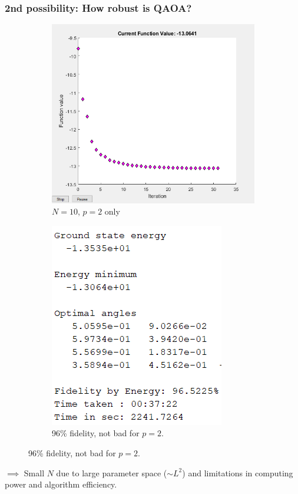 \documentclass{beamer}
\theoremstyle{definition}
\begin{document}


\begin{frame}
\frametitle{2nd possibility: How robust is QAOA?}





\begin{figure}[!htb]
	\centering
	\begin{subfigure}{0.5 \textwidth}
		\centering
		\includegraphics[scale=0.30]{N_10_p_2.PNG}
		\caption{$N=10$, $p=2$ only}
	\end{subfigure}%
	\begin{subfigure}{0.5 \textwidth}
		\centering
		\includegraphics[scale=0.47]{N_10_p_2_out}
		\caption{96\% fidelity, not bad for $p=2$.}
	\end{subfigure}
\end{figure}

\pause

$\implies$ Small $N$ due to large parameter space ($\sim L^2$) and limitations in computing power and algorithm efficiency.











\end{frame}
\end{document}
